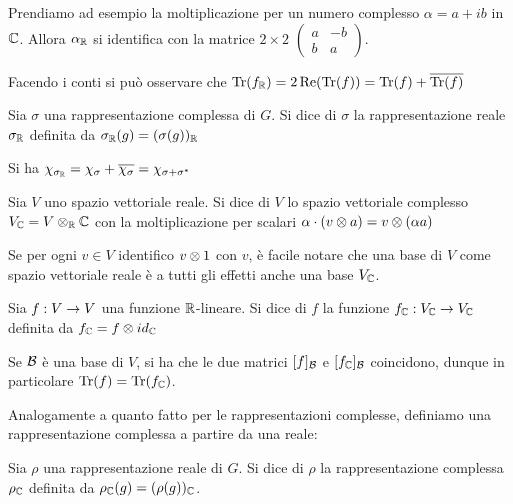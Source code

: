 	\begin{myexample}
		Prendiamo ad esempio la moltiplicazione per un numero complesso $\alpha=a+ib$ in $\mathbb C$. Allora $\alpha_\mathbb R$ si identifica con la matrice $2\times2$
		$
			\left(
				\begin{matrix}
					a  & -b  \\
					b  &  a
				\end{matrix}
			\right)
		$.
	\end{myexample}
	
	Facendo i conti si può osservare che $\operatorname{Tr}(f_\mathbb R)=2\operatorname{Re}(\operatorname{Tr}(f))=\operatorname{Tr}(f)+\overline{\operatorname{Tr}(f)}$
	
	\begin{mydef}
		Sia $\sigma$ una rappresentazione complessa di $G$. Si dice  di $\sigma$ la rappresentazione reale $\sigma_\mathbb R$ definita da $\sigma_\mathbb R(g)=(\sigma(g))_\mathbb R$
	\end{mydef}
	
	Si ha $\chi_{\sigma_\mathbb R}=\chi_\sigma + \overline{\chi_\sigma} = \chi_{\sigma+\sigma^*}$
	
	\begin{mydef}
		Sia $V$ uno spazio vettoriale reale. Si dice  di $V$ lo spazio vettoriale complesso $V_\mathbb C=V\otimes_\mathbb R \mathbb C$ con la moltiplicazione per scalari $\alpha \cdot (v\otimes a)= v\otimes (\alpha a)$
	\end{mydef}
	
	Se per ogni $v \in V$ identifico $v\otimes 1$ con $v$, è facile notare che una base di $V$ come spazio vettoriale reale è a tutti gli effetti anche una base $V_\mathbb C$.
	
	\begin{mydef}
		Sia $f:V\rightarrow V$ una funzione $\mathbb R$-lineare. Si dice  di $f$ la funzione $f_\mathbb C:V_\mathbb C \rightarrow V_\mathbb C$ definita da $f_\mathbb C=f\otimes id_\mathbb C$
	\end{mydef}
	
	Se $\mathcal B$ è una base di $V$, si ha che le due matrici $[f]_\mathcal B$ e $[f_\mathbb C]_\mathcal B$ coincidono, dunque in particolare $\operatorname{Tr}(f)=\operatorname{Tr}(f_\mathbb C)$.
	
	Analogamente a quanto fatto per le rappresentazioni complesse, definiamo una rappresentazione complessa a partire da una reale:
	
	\begin{mydef}
		Sia $\rho$ una rappresentazione reale di $G$. Si dice  di $\rho$ la rappresentazione complessa $\rho_\mathbb C$ definita da $\rho_\mathbb C(g)=(\rho(g))_\mathbb C$.
	\end{mydef}

